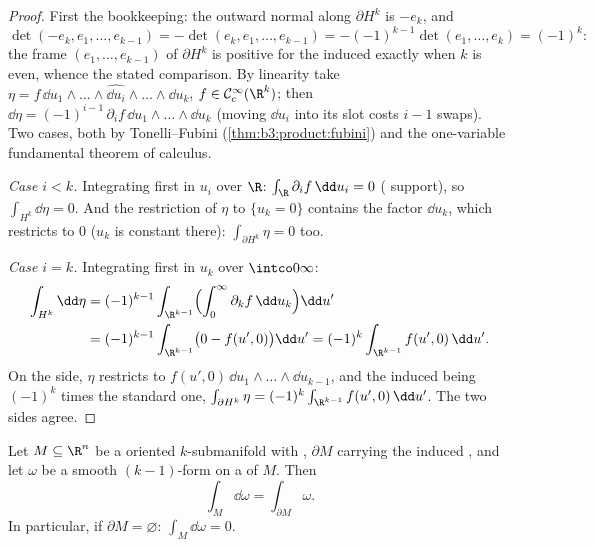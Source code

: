 \begin{proof}
First the  bookkeeping: the outward normal along
$\partial H^k$ is $-e_k$, and
\[
\det(-e_k, e_1, \dots, e_{k-1}) =
-\det(e_k, e_1, \dots, e_{k-1}) = -(-1)^{k-1}\det(e_1,
\dots, e_k) = (-1)^k :
\]
the frame $(e_1, \dots, e_{k-1})$ of $\partial H^k$ is
positive for the induced  exactly when $k$ is
even, whence the stated comparison. By linearity take $\eta
= f\,\dd u_1\wedge\dots\wedge\widehat{\dd
u_i}\wedge\dots\wedge\dd u_k$, $f \in \mathcal
C^\infty_c(\R^k)$; then $\dd\eta =
(-1)^{i-1}\,\partial_if\,\dd u_1\wedge\dots\wedge\dd u_k$
(moving $\dd u_i$ into its slot costs $i - 1$ swaps). Two
cases, both by Tonelli--Fubini
(\cref{thm:b3:product:fubini}) and the one-variable
fundamental theorem of calculus.

\emph{Case $i < k$.} Integrating first in $u_i$ over $\R$:
$\int_\R\partial_if\,\dd u_i = 0$ ( support), so
$\int_{H^k}\dd\eta = 0$. And the restriction of $\eta$ to
$\{u_k = 0\}$ contains the factor $\dd u_k$, which restricts
to $0$ ($u_k$ is constant there): $\int_{\partial H^k}\eta =
0$ too.

\emph{Case $i = k$.} Integrating first in $u_k$ over
$\intco0\infty$:
\begin{align*}
\int_{H^k}\dd\eta &= (-1)^{k-1}\int_{\R^{k-1}}
\Bigl(\int_0^\infty\partial_kf\,\dd u_k\Bigr)\dd u' \\
&= (-1)^{k-1}\int_{\R^{k-1}}\bigl(0 - f(u', 0)\bigr)\dd u'
= (-1)^k\int_{\R^{k-1}}f(u',0)\,\dd u' .
\end{align*}
On the  side, $\eta$ restricts to $f(u',
0)\,\dd u_1\wedge\dots\wedge\dd u_{k-1}$, and the induced
 being $(-1)^k$ times the standard one,
$\int_{\partial H^k}\eta =
(-1)^k\int_{\R^{k-1}}f(u',0)\,\dd u'$. The two sides agree.
\end{proof}

\begin{theorem}[Stokes]\label{thm:b3:forms:stokes}
Let $M \subseteq \R^n$ be a  oriented $k$-submanifold
with , $\partial M$ carrying the induced
, and let $\omega$ be a smooth $(k-1)$-form on a
 of $M$. Then
\[
\int_M\dd\omega = \int_{\partial M}\omega .
\]
In particular, if $\partial M = \varnothing$:
$\int_M\dd\omega = 0$.
\end{theorem}

